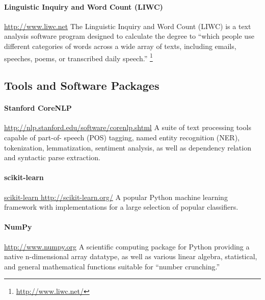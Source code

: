 \documentclass[
10pt, %
a4paper, %
oneside, %
headinclude,footinclude, %
BCOR5mm, %
]{scrartcl}
\begin{document}
\paragraph{\textbf{Linguistic Inquiry and Word Count (LIWC)}}
\hfill \newline \noindent \url{http://www.liwc.net}
\hfill \newline \noindent The Linguistic Inquiry and Word Count (LIWC) is a text
analysis software program designed to calculate the degree to ``which people use 
different categories of words across a wide array of texts, including emails, 
speeches, poems, or transcribed daily speech.'' \footnote{\url{http://www.liwc.net/}}

\subsection{Tools and Software Packages}

\paragraph{\textbf{Stanford CoreNLP}}
\hfill \newline \noindent \url{http://nlp.stanford.edu/software/corenlp.shtml}
\hfill \newline \noindent A suite of text processing tools capable of part-of-
speech (POS) tagging, named entity recognition (NER), tokenization,
lemmatization, sentiment analysis, as well as dependency relation and 
syntactic parse extraction.

\paragraph{\textbf{scikit-learn}}
\hfill \newline \noindent \url{scikit-learn http://scikit-learn.org/}
\hfill \newline \noindent A popular Python machine learning framework with
implementations for a large selection of popular classifiers.

\paragraph{\textbf{NumPy}}
\hfill \newline \noindent \url{http://www.numpy.org}
\hfill \newline \noindent A scientific computing package for Python providing a
native n-dimensional array datatype, as well as various linear algebra,
statistical, and general mathematical functions suitable for ``number
crunching.''
\end{document}
